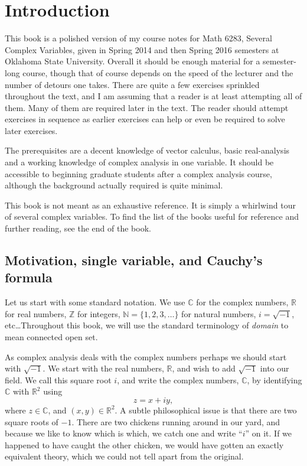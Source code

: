 \documentclass[12pt,openany]{book}
\newcommand{\C}{{\mathbb{C}}}
\newcommand{\R}{{\mathbb{R}}}
\newcommand{\Z}{{\mathbb{Z}}}
\newcommand{\N}{{\mathbb{N}}}
\newcommand{\myindex}[1]{#1\index{#1}}
\theoremstyle{plain}
\theoremstyle{remark}
\theoremstyle{definition}
\theoremstyle{exercise}
\theoremstyle{example}
\begin{document}
\chapter*{Introduction}


This book is a polished version of my course notes for Math 6283, Several
Complex Variables, given in
Spring 2014 and then Spring 2016 semesters at Oklahoma State University.
Overall it should be enough material for a semester-long course, though that
of course depends on the speed of the lecturer and the number of detours one
takes.  There are quite a few
exercises sprinkled throughout the text, and I am assuming that a reader is
at least attempting all of them.  Many of them are required later in the
text.  The reader should attempt exercises in sequence as earlier exercises
can help or even be required to solve later exercises.

The prerequisites are a decent knowledge of vector calculus, basic
real-analysis and a working knowledge of complex analysis in one variable.
It should be accessible to beginning graduate students after a complex
analysis course, although the background actually required is quite minimal.

This book is not meant as an exhaustive reference.  It is simply a whirlwind
tour of several complex variables.  To find the list of the books useful for
reference and further reading, see the end of the book.


\section{Motivation, single variable, and Cauchy's formula} \label{sec:motivation}


Let us start with some standard notation.
We use $\C$ for the complex numbers, $\R$
for real numbers, $\Z$ for integers, $\N = \{ 1,2,3,\ldots \}$ for natural
numbers, $i = \sqrt{-1}$, etc\ldots  Throughout this book, we will use
the standard terminology of \emph{\myindex{domain}} to mean connected open
set.

As complex analysis deals with the complex numbers perhaps we should start
with $\sqrt{-1}$.  We start with the real numbers, $\R$, and wish to add
$\sqrt{-1}$ into our field.  We call this square root $i$, and write the
complex numbers, $\C$, by
identifying 
$\C$ with $\R^2$ using
\begin{equation*}
z = x+iy,
\end{equation*}
where $z \in \C$, and $(x,y) \in \R^2$.  
A subtle philosophical issue is that there are two square roots of $-1$.
There are 
two chickens running around in our yard, and because we like to
know which is which, we catch one and write ``$i$'' on it.  If we happened
to have caught the other chicken, we would have gotten an exactly equivalent
theory, which we could not tell apart from the original.
\end{document}

